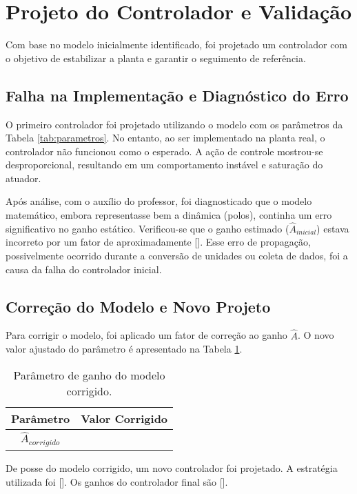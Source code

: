 \section{Projeto do Controlador e Validação}

Com base no modelo inicialmente identificado, foi projetado um controlador com o objetivo de estabilizar a planta e garantir o seguimento de referência.

\subsection{Falha na Implementação e Diagnóstico do Erro}
O primeiro controlador foi projetado utilizando o modelo com os parâmetros da Tabela \ref{tab:parametros}. No entanto, ao ser implementado na planta real, o controlador não funcionou como o esperado. A ação de controle mostrou-se desproporcional, resultando em um comportamento instável e saturação do atuador.

Após análise, com o auxílio do professor, foi diagnosticado que o modelo matemático, embora representasse bem a dinâmica (polos), continha um erro significativo no ganho estático. Verificou-se que o ganho estimado ($\hat{A}_{inicial}$) estava incorreto por um fator de aproximadamente []. Esse erro de propagação, possivelmente ocorrido durante a conversão de unidades ou coleta de dados, foi a causa da falha do controlador inicial.

\subsection{Correção do Modelo e Novo Projeto}
Para corrigir o modelo, foi aplicado um fator de correção ao ganho $\hat{A}$. O novo valor ajustado do parâmetro é apresentado na Tabela \ref{tab:parametros_corrigido}.

\begin{table}[h]
    \centering
    \caption{Parâmetro de ganho do modelo corrigido.}
    \label{tab:parametros_corrigido}
    \begin{tabular}{cc}
        \toprule
        \textbf{Parâmetro} & \textbf{Valor Corrigido} \\
        \midrule
        $\hat{A}_{corrigido}$ & %
        \\
        \bottomrule
    \end{tabular}
\end{table}

De posse do modelo corrigido, um novo controlador foi projetado. A estratégia utilizada foi []. Os ganhos do controlador final são [].


